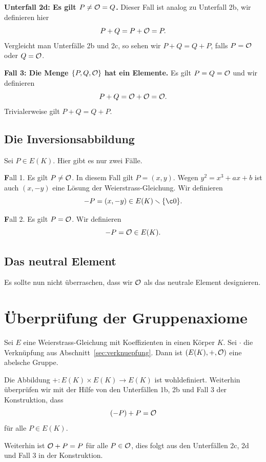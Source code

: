 \textbf{Unterfall 2d: Es gilt $P\not={\mathcal O}=Q$.}
Dieser Fall ist analog zu Unterfall 2b, wir definieren hier
\begin{equation*}
  P+Q = P+{\mathcal O} = P. 
\end{equation*}
Vergleicht man Unterfälle 2b und 2c, so sehen wir $P+Q=Q+P$, falls
$P={\mathcal O}$ oder $Q={\mathcal O}$. 


\medskip
\textbf{Fall 3: Die Menge $\{P,Q,{\mathcal O}\}$ hat ein Elemente.} Es gilt
$P=Q={\mathcal O}$ und wir definieren
\begin{equation*}
  P+Q = {\mathcal O}+{\mathcal O} = {\mathcal O}. 
\end{equation*}
Trivialerweise gilt $P+Q=Q+P$. 

\subsection{Die Inversionsabbildung}

Sei $P\in E(K)$. Hier gibt es nur zwei Fälle.

{\textbf Fall 1. Es gilt $P\not={\mathcal O}$.} In diesem Fall gilt $P=(x,y)$.
Wegen $y^2 = x^3+ax+b$ ist auch $(x,-y)$ eine Lösung der Weierstrass-Gleichung.
Wir  definieren
$$
-P = (x,-y)\in E(K)\ssm\{\c0\}.
$$

{\textbf Fall 2. Es gilt $P={\mathcal O}$.} 
Wir  definieren
$$
-P = {\mathcal O} \in E(K).
$$

\subsection{Das neutral Element}
Es sollte nun nicht überraschen, dass wir ${\mathcal O}$ als das neutrale
Element designieren.

\section{Überprüfung der Gruppenaxiome}

\begin{satz}
  Sei $E$ eine Weierstrass-Gleichung mit Koeffizienten in einen Körper
  $K$. Sei $\cdot$ die Verknüpfung aus
  Abschnitt~\ref{sec:verknuepfung}.
  Dann ist $(E(K),+,{\mathcal O})$ eine abelsche Gruppe. 
\end{satz}

Die Abbildung $+\colon E(K)\times E(K) \rightarrow E(K)$ ist
wohldefiniert. Weiterhin überprüfen wir mit der Hilfe von den  Unterfällen
1b, 2b und Fall 3 der Konstruktion, dass
$$  (-P)+P = {\mathcal O}$$
für alle $P\in E(K)$.

Weiterhin ist ${\mathcal O} + P = P $ für alle $P\in {\mathcal O}$, dies folgt aus den
Unterfällen 2c, 2d und Fall 3 in der Konstruktion. 

